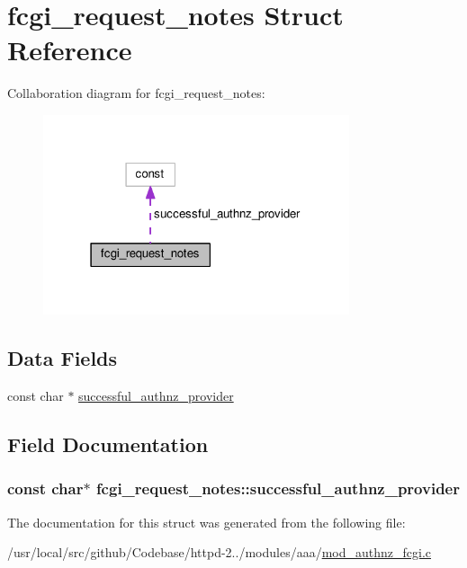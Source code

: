\hypertarget{structfcgi__request__notes}{}\section{fcgi\+\_\+request\+\_\+notes Struct Reference}
\label{structfcgi__request__notes}


Collaboration diagram for fcgi\+\_\+request\+\_\+notes\+:
\nopagebreak
\begin{figure}[H]
\begin{center}
\leavevmode
\includegraphics[width=255pt]{structfcgi__request__notes__coll__graph}
\end{center}
\end{figure}
\subsection*{Data Fields}
\begin{DoxyCompactItemize}
\item 
const char $\ast$ \hyperlink{structfcgi__request__notes_a7e54804748c5de969e498904a2ac5708}{successful\+\_\+authnz\+\_\+provider}
\end{DoxyCompactItemize}


\subsection{Field Documentation}
\subsubsection[{\texorpdfstring{successful\+\_\+authnz\+\_\+provider}{successful_authnz_provider}}]{\setlength{\rightskip}{0pt plus 5cm}const char$\ast$ fcgi\+\_\+request\+\_\+notes\+::successful\+\_\+authnz\+\_\+provider}\hypertarget{structfcgi__request__notes_a7e54804748c5de969e498904a2ac5708}{}\label{structfcgi__request__notes_a7e54804748c5de969e498904a2ac5708}


The documentation for this struct was generated from the following file\+:\begin{DoxyCompactItemize}
\item 
/usr/local/src/github/\+Codebase/httpd-\/2../modules/aaa/\hyperlink{mod__authnz__fcgi_8c}{mod\+\_\+authnz\+\_\+fcgi.\+c}\end{DoxyCompactItemize}
